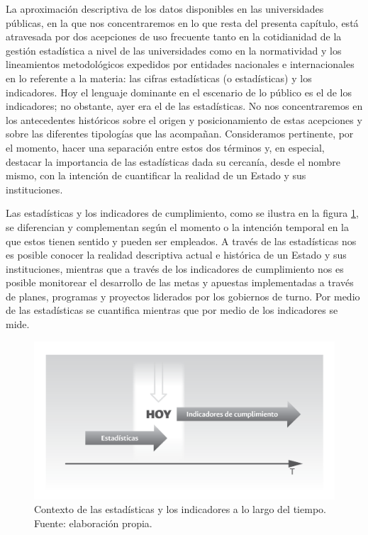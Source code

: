 \documentclass[
]{book}
\begin{document}
La aproximación descriptiva de los datos disponibles en las universidades públicas, en la que nos concentraremos en lo que resta del presenta capítulo, está atravesada por dos acepciones de uso frecuente tanto en la cotidianidad de la gestión estadística a nivel de las universidades como en la normatividad y los lineamientos metodológicos expedidos por entidades nacionales e internacionales en lo referente a la materia: las cifras estadísticas (o estadísticas) y los indicadores. Hoy el lenguaje dominante en el escenario de lo público es el de los indicadores; no obstante, ayer era el de las estadísticas. No nos concentraremos en los antecedentes históricos sobre el origen y posicionamiento de estas acepciones y sobre las diferentes tipologías que las acompañan. Consideramos pertinente, por el momento, hacer una separación entre estos dos términos y, en especial, destacar la importancia de las estadísticas dada su cercanía, desde el nombre mismo, con la intención de cuantificar la realidad de un Estado y sus instituciones.

Las estadísticas y los indicadores de cumplimiento, como se ilustra en la figura \ref{fig:fig17}, se diferencian y complementan según el momento o la intención temporal en la que estos tienen sentido y pueden ser empleados. A través de las estadísticas nos es posible conocer la realidad descriptiva actual e histórica de un Estado y sus instituciones, mientras que a través de los indicadores de cumplimiento nos es posible monitorear el desarrollo de las metas y apuestas implementadas a través de planes, programas y proyectos liderados por los gobiernos de turno. Por medio de las estadísticas se cuantifica mientras que por medio de los indicadores se mide.

\begin{figure}

{\centering \includegraphics[width=0.75\linewidth]{imagenes/F_17} 

}

\caption{Contexto de las estadísticas y los indicadores a lo largo del tiempo. Fuente: elaboración propia.}\label{fig:fig17}
\end{figure}
\end{document}
